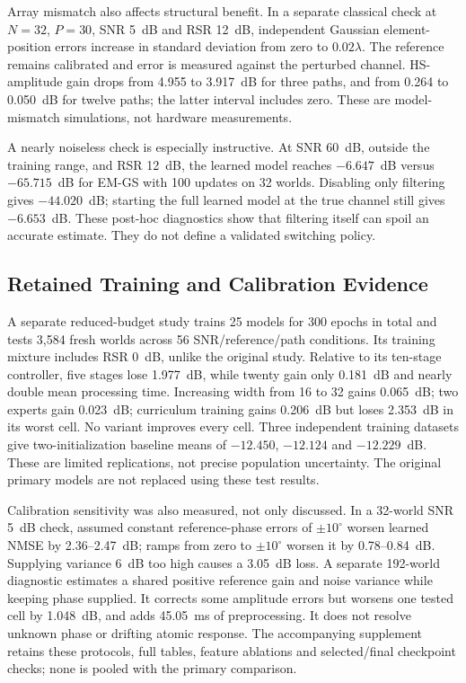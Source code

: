 \documentclass[10pt,journal,letterpaper]{IEEEtran}
\begin{document}
Array mismatch also affects structural benefit. In a separate classical check at $N=32$, $P=30$, SNR 5~dB and RSR 12~dB, independent Gaussian element-position errors increase in standard deviation from zero to $0.02\lambda$. The reference remains calibrated and error is measured against the perturbed channel. HS-amplitude gain drops from 4.955 to 3.917~dB for three paths, and from 0.264 to 0.050~dB for twelve paths; the latter interval includes zero. These are model-mismatch simulations, not hardware measurements.

A nearly noiseless check is especially instructive. At SNR 60~dB, outside the training range, and RSR 12~dB, the learned model reaches $-6.647$~dB versus $-65.715$~dB for EM-GS with 100 updates on 32 worlds. Disabling only filtering gives $-44.020$~dB; starting the full learned model at the true channel still gives $-6.653$~dB. These post-hoc diagnostics show that filtering itself can spoil an accurate estimate. They do not define a validated switching policy.

\subsection{Retained Training and Calibration Evidence}
A separate reduced-budget study trains 25 models for 300 epochs in total and tests 3,584 fresh worlds across 56 SNR/reference/path conditions. Its training mixture includes RSR 0~dB, unlike the original study. Relative to its ten-stage controller, five stages lose 1.977~dB, while twenty gain only 0.181~dB and nearly double mean processing time. Increasing width from 16 to 32 gains 0.065~dB; two experts gain 0.023~dB; curriculum training gains 0.206~dB but loses 2.353~dB in its worst cell. No variant improves every cell. Three independent training datasets give two-initialization baseline means of $-12.450$, $-12.124$ and $-12.229$~dB. These are limited replications, not precise population uncertainty. The original primary models are not replaced using these test results.

Calibration sensitivity was also measured, not only discussed. In a 32-world SNR 5~dB check, assumed constant reference-phase errors of $\pm10^\circ$ worsen learned NMSE by 2.36--2.47~dB; ramps from zero to $\pm10^\circ$ worsen it by 0.78--0.84~dB. Supplying variance 6~dB too high causes a 3.05~dB loss. A separate 192-world diagnostic estimates a shared positive reference gain and noise variance while keeping phase supplied. It corrects some amplitude errors but worsens one tested cell by 1.048~dB, and adds 45.05~ms of preprocessing. It does not resolve unknown phase or drifting atomic response. The accompanying supplement retains these protocols, full tables, feature ablations and selected/final checkpoint checks; none is pooled with the primary comparison.
\end{document}
